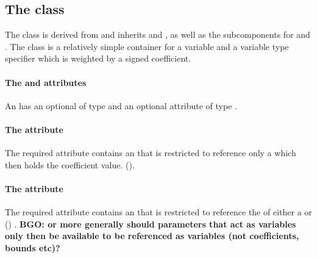 
\subsection{The \FBC {} class}
\label{userconstraintcomponent-class}

The \FBC \UserConstraintComponent class is derived from \SBML \SBase and inherits
 and , as well as the subcomponents for
\Annotation and \Notes. The \UserConstraintComponent class is a relatively simple container for a variable and a variable type specifier which is weighted by a signed coefficient.

\paragraph{The  and  attributes}
An \UserConstraintComponent has an optional  of type  and an optional attribute  of type .

\paragraph{The  attribute}
The required  attribute contains an  that is restricted to reference only a \Parameter which then holds the coefficient value. ().

\paragraph{The  attribute}
The required  attribute contains an  that is restricted to reference the  of either a \Reaction or () \Parameter.  {\textbf{\large BGO: or more generally should parameters that act as variables only then be available to be referenced as variables (not coefficients, bounds etc)?}}

